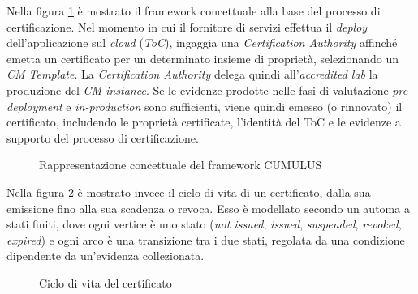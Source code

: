 \documentclass[../main.tex]{subfiles}
\begin{document}
Nella figura \ref{fig:processocertific} è mostrato il framework concettuale alla base del processo di certificazione\cite{TrustModelCloudAnisDamArd}.
Nel momento in cui il fornitore di servizi effettua il \textit{deploy} dell'applicazione sul \textit{cloud} (\textit{ToC}), ingaggia una \textit{Certification Authority} affinché emetta un certificato per un determinato insieme di proprietà, selezionando un \textit{CM Template}.
La \textit{Certification Authority} delega quindi all'\textit{accredited lab} la produzione del \textit{CM instance}.
Se le evidenze prodotte nelle fasi di valutazione \textit{pre-deployment} e \textit{in-production} sono sufficienti, viene quindi emesso (o rinnovato) il certificato, includendo le proprietà certificate, l'identità del ToC e le evidenze a supporto del processo di certificazione.
\begin{figure}[H]
\centering
{}
\caption{Rappresentazione concettuale del framework CUMULUS \cite{Cloud1}}\label{fig:processocertific}
\end{figure}

Nella figura \ref{fig:lifecyclecertificato} è mostrato invece il ciclo di vita di un certificato, dalla sua emissione fino alla sua scadenza o revoca.
Esso è modellato secondo un automa a stati finiti, dove ogni vertice è uno stato (\textit{not issued}, \textit{issued}, \textit{suspended}, \textit{revoked}, \textit{expired}) e ogni arco è una transizione tra i due stati, regolata da una condizione dipendente da un'evidenza collezionata.
\begin{figure}[H]
\centering
{}
\caption{Ciclo di vita del certificato \cite{Cloud1}}\label{fig:lifecyclecertificato}
\end{figure}
\end{document}
